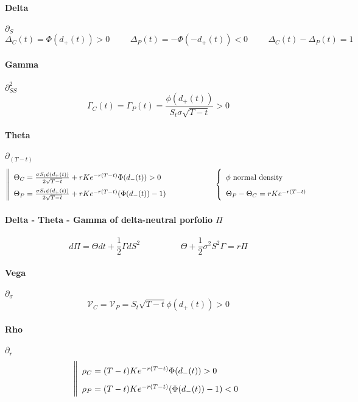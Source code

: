 \documentclass[a4paper,10pt]{article}
\begin{document}
\paragraph{Delta} $\partial_{S}$
\[
\Delta_C(t) = \Phi(d_+(t))>0
\hspace{1cm}
\Delta_P(t) = -\Phi(-d_+(t))<0
\hspace{1cm}
\Delta_C(t) - \Delta_P(t) = 1
\]
\paragraph{Gamma} $\partial^2_{SS}$
\[
\Gamma_C(t) = \Gamma_P(t) = \frac{\phi(d_+(t)) }{S_t \sigma \sqrt{T-t}} >0
\]
\paragraph{Theta} $\partial_{(T-t)}$
\[\def\arraystretch{1.8}
\left\| 
\begin{array}{l}
\Theta_C = \frac{\sigma S_t \phi(d_+(t)) }{2\sqrt{T-t}} + rKe^{-r(T-t)} \Phi(d_-(t)) >0 \\
\Theta_P = \frac{\sigma S_t \phi(d_+(t)) }{2\sqrt{T-t}} + rKe^{-r(T-t)} (\Phi(d_-(t))-1) 
\end{array}\right. 
\hspace{2cm}
\left\{ 
\begin{array}{l}
\phi \text{ normal density} \\
\Theta_P - \Theta_C = rKe^{-r(T-t)}
\end{array}\right. 
\]
\paragraph{Delta - Theta - Gamma of delta-neutral porfolio $\Pi$}
\[
d\Pi = \Theta dt + \frac{1}{2} \Gamma dS^2
\hspace{2cm}
\Theta + \frac{1}{2}\sigma^2 S^2 \Gamma = r\Pi
\]
\paragraph{Vega}$\partial_{\sigma}$
\[
\mathcal{V}_C = \mathcal{V}_P = S_t \sqrt{T-t} \phi(d_+(t))>0
\]
\paragraph{Rho} $\partial_{r}$
\[\def\arraystretch{1.8}
\left\| 
\begin{array}{l}
\rho_C = (T-t)Ke^{-r(T-t)}\Phi(d_-(t))    > 0 \\
\rho_P = (T-t)Ke^{-r(T-t)}(\Phi(d_-(t))-1)  < 0
\end{array}\right. 
\]
\end{document}

